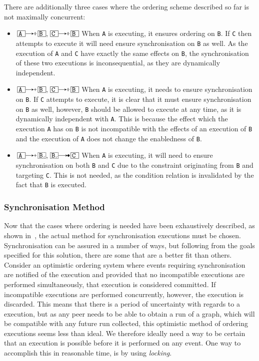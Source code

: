 \documentclass{article}
\begin{document}
	There are additionally three cases where the ordering scheme described so far is not maximally concurrent:
	\begin{itemize}
		\item $\ev{A} \erel \ev{B}, \ev{C} \erel \ev{B}$ When \texttt{A} is executing, it ensures ordering on \texttt{B}.
        If \texttt{C} then attempts to execute it will need ensure synchronisation on \texttt{B} as well.
        As the execution of \texttt{A} and \texttt{C} have exactly the same effects on \texttt{B}, the synchronisation of these two executions is inconsequential, as they are dynamically independent.
		\item $\ev{A} \irel \ev{B}, \ev{C} \erel \ev{B}$ When \texttt{A} is executing, it needs to ensure synchronisation on \texttt{B}.
        If \texttt{C} attempts to execute, it is clear that it must ensure synchronisation on \texttt{B} as well, however, \texttt{B} should be allowed to execute at any time, as it is dynamically independent with \texttt{A}.
        This is because the effect which the execution \texttt{A} has on \texttt{B} is not incompatible with the effects of an execution of \texttt{B} and the execution of \texttt{A} does not change the enabledness of \texttt{B}.
		\item $\ev{A} \irel \ev[100]{B}, \ev[100]{B} \crel \ev{C}$ When \texttt{A} is executing, it will need to ensure synchronisation on both \texttt{B} and \texttt{C} due to the constraint originating from \texttt{B} and targeting \texttt{C}.
        This is not needed, as the condition relation is invalidated by the fact that \texttt{B} is executed.
	\end{itemize}

    \subsubsection{Synchronisation Method}
    \label{subsubsec:synchronisation-method}

	Now that the cases where ordering is needed have been exhaustively described, as shown in~\cite{debois_concurrency_2015}, the actual method for synchronisation executions must be chosen.
	Synchronisation can be assured in a number of ways, but following from the goals specified for this solution, there are some that are a better fit than others.
	Consider an optimistic ordering system where events requiring synchronisation are notified of the execution and provided that no incompatible executions are performed simultaneously, that execution is considered committed.
	If incompatible executions are performed concurrently, however, the execution is discarded.
	This means that there is a period of uncertainty with regards to a execution, but as any peer needs to be able to obtain a run of a graph, which will be compatible with any future run collected, this optimistic method of ordering executions seems less than ideal.
	We therefore ideally need a way to be certain that an execution is possible before it is performed on any event.
	One way to accomplish this in reasonable time, is by using \textit{locking}.
\end{document}
